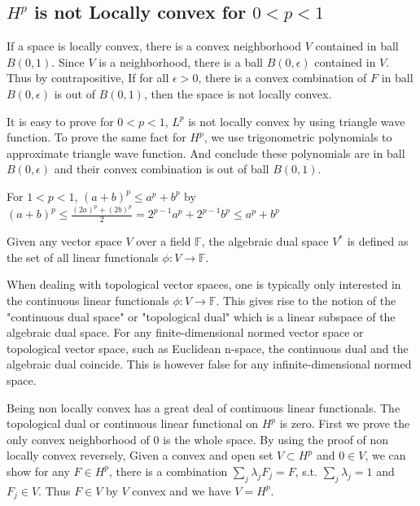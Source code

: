 \subsection{$H^p$ is not Locally convex for $0<p<1$}\label{sec: locally convex}
If a space is locally convex, there is a convex neighborhood $V$ contained in ball $B(0,1)$. Since $V$ is a neighborhood, there is
a ball $B(0,\epsilon)$ contained in $V$. Thus by contrapositive, If for all $\epsilon>0$, there is a convex combination of $F$ in ball $B(0,\epsilon)$
is out of $B(0,1)$, then the space is not locally convex.\par
It is easy to prove for $0<p<1$, $L^p$ is not locally convex by using triangle wave function. To prove the same fact for $H^p$, we use trigonometric
polynomials to approximate triangle wave function. And conclude these polynomials are in ball $B(0,\epsilon)$ and their convex combination is out of
ball $B(0,1)$.
\begin{remark}
    For $1<p<1$, $(a+b)^p\leq a^p+b^p$ by $(a+b)^p\leq\frac{(2a)^p+(2b)^p}{2}=2^{p-1}a^p+2^{p-1}b^p\leq a^p+b^p$\par
\end{remark}
\begin{remark}
    Given any vector space $V$ over a field $\mathbb{F}$, the algebraic dual space $V^*$ is defined as the set of all linear functionals $\phi:V\to \mathbb{F}$.\par
    When dealing with topological vector spaces, one is typically only interested in the continuous linear functionals $\phi:V\to \mathbb{F}$.
    This gives rise to the notion of the "continuous dual space" or "topological dual" which is a linear subspace of the algebraic dual space.
    For any finite-dimensional normed vector space or topological vector space, such as Euclidean n-space, the continuous dual and the algebraic dual coincide.
    This is however false for any infinite-dimensional normed space.
\end{remark}
Being non locally convex has a great deal of continuous linear functionals. The topological dual or continuous linear functional on $H^p$ is zero.
First we prove the only convex neighborhood of 0 is the whole space. By using the proof of non locally convex reversely, Given a convex and open set $V\subset H^p$ and $0\in V$,
we can show for any $F\in H^p$, there is a combination $\sum_j{\lambda_jF_j}=F$, s.t. $\sum_j{\lambda_j}=1$ and $F_j\in V$. Thus $F\in V$ by $V$ convex and we have $V=H^p$.\par
